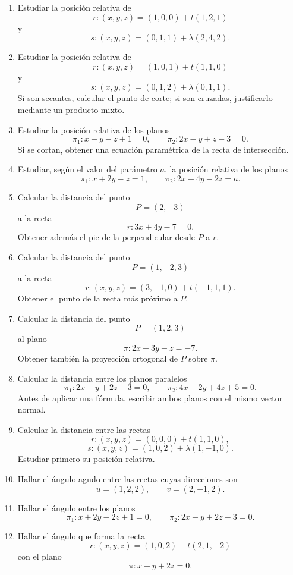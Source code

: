 \begin{enumerate}
\item Estudiar la posición relativa de
\[
r:(x,y,z)=(1,0,0)+t(1,2,1)
\]
y
\[
s:(x,y,z)=(0,1,1)+\lambda(2,4,2).
\]

\item Estudiar la posición relativa de
\[
r:(x,y,z)=(1,0,1)+t(1,1,0)
\]
y
\[
s:(x,y,z)=(0,1,2)+\lambda(0,1,1).
\]
Si son secantes, calcular el punto de corte; si son cruzadas, justificarlo mediante un producto mixto.

\item Estudiar la posición relativa de los planos
\[
\pi_1:x+y-z+1=0,
\qquad
\pi_2:2x-y+z-3=0.
\]
Si se cortan, obtener una ecuación paramétrica de la recta de intersección.

\item Estudiar, según el valor del parámetro $a$, la posición relativa de los planos
\[
\pi_1:x+2y-z=1,
\qquad
\pi_2:2x+4y-2z=a.
\]

\item Calcular la distancia del punto
\[
P=(2,-3)
\]
a la recta
\[
r:3x+4y-7=0.
\]
Obtener además el pie de la perpendicular desde $P$ a $r$.

\item Calcular la distancia del punto
\[
P=(1,-2,3)
\]
a la recta
\[
r:(x,y,z)=(3,-1,0)+t(-1,1,1).
\]
Obtener el punto de la recta más próximo a $P$.

\item Calcular la distancia del punto
\[
P=(1,2,3)
\]
al plano
\[
\pi:2x+3y-z=-7.
\]
Obtener también la proyección ortogonal de $P$ sobre $\pi$.

\item Calcular la distancia entre los planos paralelos
\[
\pi_1:2x-y+2z-3=0,
\qquad
\pi_2:4x-2y+4z+5=0.
\]
Antes de aplicar una fórmula, escribir ambos planos con el mismo vector normal.

\item Calcular la distancia entre las rectas
\[
r:(x,y,z)=(0,0,0)+t(1,1,0),
\]
\[
s:(x,y,z)=(1,0,2)+\lambda(1,-1,0).
\]
Estudiar primero su posición relativa.

\item Hallar el ángulo agudo entre las rectas cuyas direcciones son
\[
u=(1,2,2),\qquad v=(2,-1,2).
\]

\item Hallar el ángulo entre los planos
\[
\pi_1:x+2y-2z+1=0,
\qquad
\pi_2:2x-y+2z-3=0.
\]

\item Hallar el ángulo que forma la recta
\[
r:(x,y,z)=(1,0,2)+t(2,1,-2)
\]
con el plano
\[
\pi:x-y+2z=0.
\]


\end{enumerate}
